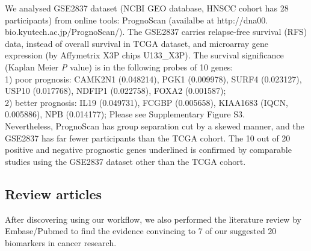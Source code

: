 \documentclass[jpm,article,submit,moreauthors,pdftex]{Definitions/mdpi}
\begin{document}
\begin{paracol}{2}
We analysed GSE2837 dataset (NCBI GEO database\cite{Chung2006}, HNSCC cohort has 28 participants) from online tools: PrognoScan (availalbe at http://dna00.\\bio.kyutech.ac.jp/PrognoScan/)\cite{Mizuno2009a}.
The GSE2837 carries %
relapse-free survival (RFS) data, instead of overall survival in TCGA dataset,
and microarray gene expression (by Affymetrix X3P chips U133\_X3P).
The survival significance (Kaplan Meier \textit{P} value) is in the following probes of 10 genes:\\
1) poor prognosis: CAMK2N1 (0.048214), PGK1 (0.009978), SURF4 (0.023127), USP10 (0.017768), NDFIP1 (0.022758), FOXA2 (0.001587);\\ %
2) better prognosis: IL19 (0.049731), FCGBP (0.005658), KIAA1683 (IQCN, 0.005886), NPB (0.014177);
Please see Supplementary Figure S3.\\ %
Nevertheless, PrognoScan has group separation cut by a skewed manner, and the GSE2837 has far fewer participants than the TCGA cohort.
The 10 out of 20 positive and negative prognostic genes underlined is confirmed by comparable studies using the GSE2837 dataset other than the TCGA cohort.



\subsection*{Review articles}
After discovering using our workflow, we also performed the literature review by Embase/Pubmed to find the evidence convincing to 7 of our suggested 20 biomarkers in cancer research.


\end{paracol}
\end{document}
